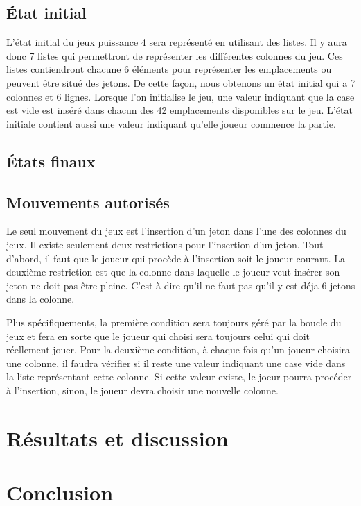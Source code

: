 \documentclass[12pt]{article}
\begin{document}
\subsection*{État initial}
L'état initial du jeux puissance 4 sera représenté en utilisant des listes. Il y aura donc 7 listes qui permettront de représenter les différentes colonnes du jeu. Ces listes contiendront chacune 6 éléments pour représenter les emplacements ou peuvent être situé des jetons. De cette façon, nous obtenons un état initial qui a 7 colonnes et 6 lignes. Lorsque l’on initialise le jeu, une valeur indiquant que la case est vide est inséré dans chacun des 42 emplacements disponibles sur le jeu. L’état initiale contient aussi une valeur indiquant qu’elle joueur commence la partie. 
 
\subsection*{États finaux}


\subsection*{Mouvements autorisés}
Le seul mouvement du jeux est l'insertion d'un jeton dans l'une des colonnes du jeux. Il existe seulement deux restrictions pour l'insertion d'un jeton. Tout d'abord, il faut que le joueur qui procède à l'insertion soit le joueur courant. La deuxième restriction est que la colonne dans laquelle le joueur veut insérer son jeton ne doit pas être pleine. C'est-à-dire qu'il ne faut pas qu'il y est déja 6 jetons dans la colonne. 

Plus spécifiquements, la première condition sera toujours géré par la boucle du jeux  et fera en sorte que le joueur qui choisi sera toujours celui qui doit réellement jouer. Pour la deuxième condition, à chaque fois qu'un joueur choisira une colonne, il faudra vérifier si il reste une valeur indiquant une case vide dans la liste représentant cette colonne. Si cette valeur existe, le joeur pourra procéder à l'insertion, sinon, le joueur devra choisir une nouvelle colonne. 

\section*{Résultats et discussion}
\section*{Conclusion}
\end{document}

